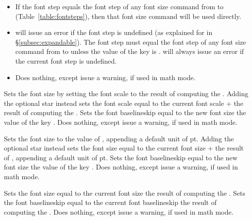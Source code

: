 \documentclass{beery}
\begin{document}
\begin{itemize}
  \item
  If the font step equals the font step of any font size command from  to  (Table~\ref{table:fontsteps}), then that font size command will be used directly.
  \item
   will issue an error if the font step is undefined (as explained for  in \S\ref{subsec:expandable}).
  The font step must equal the font step of any font size command from  to  unless the value of the key  is .
   will always issue an error if the current font step is undefined.
  \item
  Does nothing, except issue a warning, if used in math mode.
\end{itemize}

\begin{mydisplaycode}
   \sarg{} 
\end{mydisplaycode}

Sets the font size by setting the font scale to the result of computing the .
Adding the optional star instead sets the font scale equal to the current font scale + the result of computing the .
Sets the font baselineskip equal to the new font size \texttimes{} the value of the key .
Does nothing, except issue a warning, if used in math mode.

\begin{mydisplaycode}
   \sarg{} 
\end{mydisplaycode}

Sets the font size to the value of , appending a default unit of \unit{pt}.
Adding the optional star instead sets the font size equal to the current font size + the result of , appending a default unit of \unit{pt}.
Sets the font baselineskip equal to the new font size \texttimes{} the value of the key .
Does nothing, except issue a warning, if used in math mode.

\begin{mydisplaycode}
   
\end{mydisplaycode}

Sets the font size equal to the current font size \texttimes{} the result of computing the .
Sets the font baselineskip equal to the current font baselineskip \texttimes{} the result of computing the .
Does nothing, except issue a warning, if used in math mode.
\end{document}
